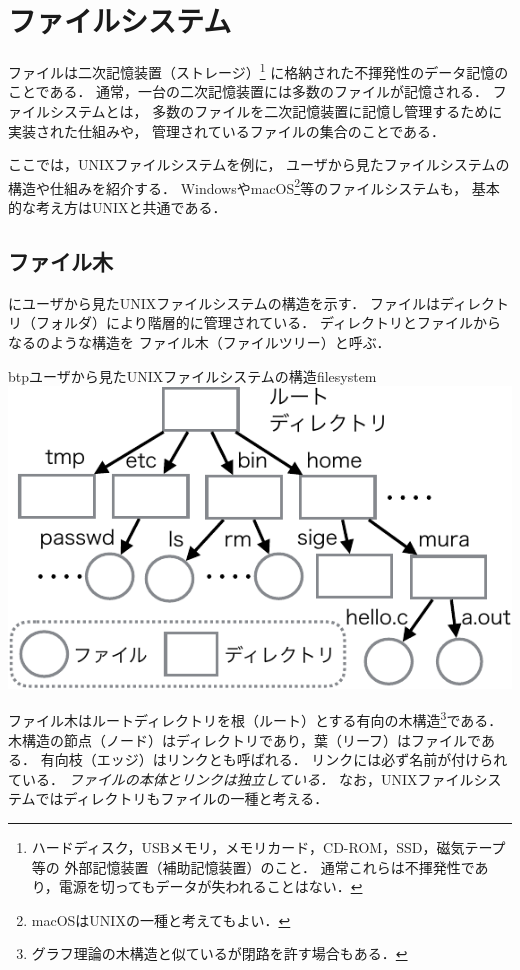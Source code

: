 \chapter{ファイルシステム}
ファイルは二次記憶装置（ストレージ）\footnote{
ハードディスク，USBメモリ，メモリカード，CD-ROM，SSD，磁気テープ等の
外部記憶装置（補助記憶装置）のこと．
通常これらは不揮発性であり，電源を切ってもデータが失われることはない．}
に格納された不揮発性のデータ記憶のことである．
通常，一台の二次記憶装置には多数のファイルが記憶される．
ファイルシステムとは，
多数のファイルを二次記憶装置に記憶し管理するために実装された仕組みや，
管理されているファイルの集合のことである．

ここでは，UNIXファイルシステムを例に，
ユーザから見たファイルシステムの構造や仕組みを紹介する．
WindowsやmacOS\footnote{macOSはUNIXの一種と考えてもよい．
}等のファイルシステムも，
基本的な考え方はUNIXと共通である．

\section{ファイル木}
にユーザから見たUNIXファイルシステムの構造を示す．
ファイルはディレクトリ（フォルダ）により階層的に管理されている．
ディレクトリとファイルからなるのような構造を
ファイル木（ファイルツリー）と呼ぶ．

\begin{myfig}{btp}{ユーザから見たUNIXファイルシステムの構造}{filesystem}
\includegraphics[scale=1.0]{Fig/FileSystem-crop.pdf}
\end{myfig}

ファイル木はルートディレクトリを根（ルート）とする有向の木構造\footnote{
グラフ理論の木構造と似ているが閉路を許す場合もある．}である．
木構造の節点（ノード）はディレクトリであり，葉（リーフ）はファイルである．
有向枝（エッジ）はリンクとも呼ばれる．
リンクには必ず名前が付けられている．
\emph{ファイルの本体とリンクは独立している．}
なお，UNIXファイルシステムではディレクトリもファイルの一種と考える．

